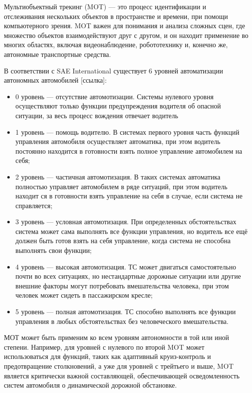 Мультиобъектный трекинг (MOT) — это процесс идентификации и отслеживания нескольких объектов в пространстве и времени, при помощи компьютерного зрения. MOT важен для понимания и анализа сложных сцен, где множество объектов взаимодействуют друг с другом, и он находит применение во многих областях, включая видеонаблюдение, робототехнику и, конечно же, автономные транспортные средства.

В соответствии с SAE International существует 6 уровней автоматизации автономных автомобилей [ссылка]:

\begin{itemize}

	\item 	0 уровень --- отсутствие автомотизации. Системы нулевого уровня осуществляют только функции предупреждения водителя об опасной ситуации, за весь процесс вождения отвечает водитель

	\item 	1 уровень --- помощь водителю. В системах первого уровня часть функций управления автомобиля осуществляет автоматика, при этом водитель постоянно находится в готовности взять полное управление автомобилем на себя;
	
	\item	2 уровень --- частичная автомотизация. В таких системах автоматика полностью управляет автомобилем в ряде ситуаций, при этом водитель находит ся в готовности взять управление на себя в случае, если система не справляется;
	
	\item	3 уровень --- условная автомотизация. При определенных обстоятельствах система может сама выполнять все функции управления, но водитель все ещё должен быть готов взять на себя управление, когда система не способна выполнять свои функции;
	
	\item 	4 уровень --- высокая автомотизация. ТС может двигаться самостоятельно почти во всех ситуациях, но нестандартные дорожные ситуации или другие внешние факторы могут потребовать вмешательства человека, при этом человек может сидеть в пассажирском кресле;
	
	\item 	5 уровень --- полная автомотизация. ТС способно выполнять все функции управления в любых обстоятельствах без человеческого вмешательства.

\end{itemize}

МОТ может быть применим ко всем уровням автономности в той или иной степени. Например, для уровней с нулевого по второй MOT может использоваться для функций, таких как адаптивный круиз-контроль и предотвращение столкновений, а уже для уровней с трейтьего и выше, MOT является критически важной составляющей, обеспечивающей осведомленность систем автомобиля о динамической дорожной обстановке.



